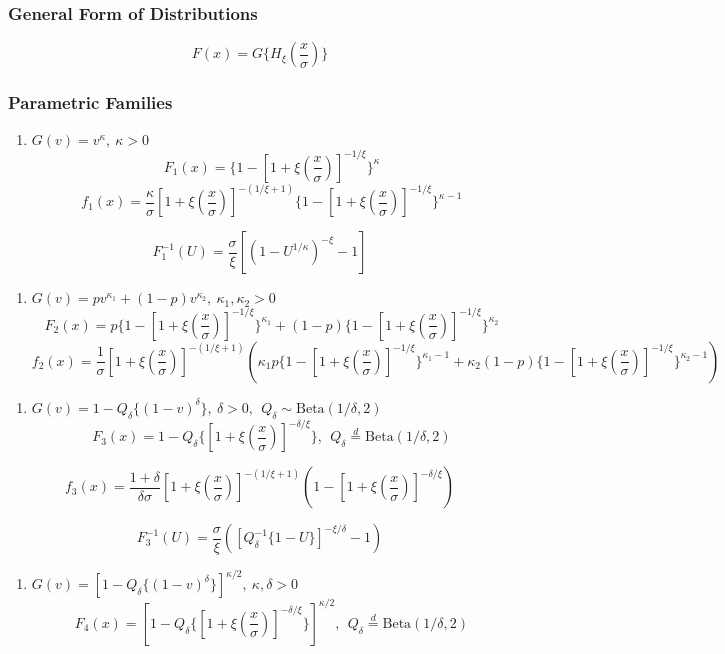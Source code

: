 \documentclass[
]{article}
\author{}
\date{\vspace{-2.5em}}
\providecommand{\tightlist}{%
  \setlength{\itemsep}{0pt}\setlength{\parskip}{0pt}}
\begin{document}
\hypertarget{general-form-of-distributions}{%
\subsubsection{General Form of
Distributions}\label{general-form-of-distributions}}

\[F(x) = G\{H_{\xi}{(\frac{x}{\sigma})} \} \]

\hypertarget{parametric-families}{%
\subsubsection{Parametric Families}\label{parametric-families}}

\begin{enumerate}
\def\labelenumi{\arabic{enumi}.}
\tightlist
\item
  \(G(v) = v^\kappa, \ \kappa > 0\)
  \[F_1(x) = \{1 - [1 + \xi(\frac{x}{\sigma})]^{-1/\xi} \}^\kappa\]
  \[f_1(x) = \frac{\kappa}{\sigma}[1 + \xi (\frac{x}{\sigma})]^{-(1/\xi + 1)}\{1 - [1+\xi(\frac{x}{\sigma})]^{-1/\xi} \} ^{\kappa-1}\]
\end{enumerate}

\[F_1^{-1}(U) = \frac{\sigma}{\xi} [(1-U^{1/\kappa})^{-\xi} - 1]\]

\begin{enumerate}
\def\labelenumi{\arabic{enumi}.}
\setcounter{enumi}{1}
\tightlist
\item
  \(G(v) = pv^{\kappa_1} + (1-p)v^{\kappa_2}, \ \kappa_1, \kappa_2 >0\)
  \[F_2(x) = p\{1 - [1 + \xi(\frac{x}{\sigma})]^{-1/\xi} \}^{\kappa_1} + (1-p)\{1 - [1 + \xi(\frac{x}{\sigma})]^{-1/\xi} \}^{\kappa_2}\]
  \[f_2(x) = \frac{1}{\sigma}[1 + \xi (\frac{x}{\sigma})]^{-(1/\xi + 1)}\left(\kappa_1p\{1 - [1+\xi(\frac{x}{\sigma})]^{-1/\xi} \} ^{\kappa_1-1} + \kappa_2(1-p)\{1 - [1+\xi(\frac{x}{\sigma})]^{-1/\xi} \} ^{\kappa_2-1}\right)\]
\end{enumerate}

\begin{enumerate}
\def\labelenumi{\arabic{enumi}.}
\setcounter{enumi}{2}
\tightlist
\item
  \(G(v) = 1-Q_\delta\{(1-v)^\delta\}, \ \delta > 0, \ \ Q_\delta \sim \text{Beta}(1/\delta, 2)\)
  \[F_3(x) = 1 - Q_\delta\{[1 + \xi(\frac{x}{\sigma})]^{-\delta/\xi} \}, \ \ Q_\delta \stackrel{d}{=}\text{Beta}(1/\delta, 2)\]
\end{enumerate}

\[f_3(x) = \frac{1 + \delta}{\delta\sigma}[1 + \xi (\frac{x}{\sigma})]^{-(1/\xi + 1)}\left(1 - [1+\xi(\frac{x}{\sigma})]^{-\delta/\xi} \right)\]

\[F_3^{-1}(U) = \frac{\sigma}{\xi}\left([Q_\delta^{-1}\{1 - U\}]^{-\xi/\delta} - 1\right)\]

\begin{enumerate}
\def\labelenumi{\arabic{enumi}.}
\setcounter{enumi}{3}
\tightlist
\item
  \(G(v) = [1-Q_\delta\{(1-v)^\delta\}]^{\kappa/2}, \ \kappa, \delta > 0\)
  \[F_4(x) = [1 - Q_\delta\{[1 + \xi(\frac{x}{\sigma})]^{-\delta/\xi} \}]^{\kappa/2}, \ \ Q_\delta \stackrel{d}{=}\text{Beta}(1/\delta, 2)\]
\end{enumerate}
\end{document}
